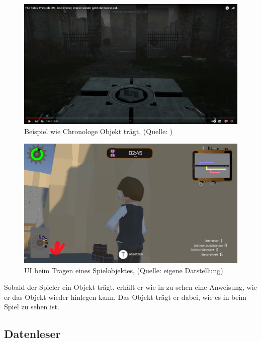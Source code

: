 \begin{figure}[ht]
\centering
\includegraphics[width=1\linewidth]{content/pictures/ObjectInArm.jpg}
\caption{Beispiel wie Chronologe Objekt trägt, (Quelle: \cite{gametube_talos_2014})}
\label{fig:carry_object_objectarm}
\end{figure}

\begin{figure}[ht]
\centering
\includegraphics[width=1\linewidth]{content/pictures/CarryObjects.jpg}
\caption{UI beim Tragen eines Spielobjektes, (Quelle: eigene Darstellung)}
\label{fig:carry_object_ui}
\end{figure}

Sobald der Spieler ein Objekt trägt, erhält er wie in  zu sehen eine Anweisung, wie er das Objekt wieder hinlegen kann. Das Objekt trägt er dabei, wie es in  beim Spiel  zu sehen ist.


\subsection{Datenleser}\label{sec:datenleser_ui}


